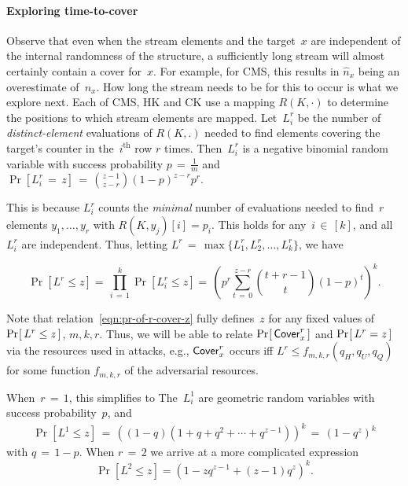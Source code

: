 \paragraph{Exploring time-to-cover}
Observe that even when the stream elements and the target~$x$ are independent of the internal randomness of the structure, a sufficiently long stream will almost certainly contain a cover for~$x$. For example, for CMS, this results in $\hat{n}_x$ being an overestimate of~$n_x$.  How long the stream needs to be for this to occur is what we explore next. 
Each of CMS, HK and CK use a mapping $R(K,\cdot)$ to determine the positions to which stream elements are mapped.
Let~$L^r_i$ be the number of \textit{distinct-element} evaluations of $R(K,.)$  
needed to find elements covering the target's counter in the~$i^{\mathrm{th}}$ row $r$ times. 
Then~$L^r_i$ is a negative binomial random variable with success probability $p\,{=}\, \frac{1}{m}$ and $\Pr[L^r_i \,{=}\,  z]\,{=}\,\binom{z-1}{z-r}(1-p)^{z-r}p^{r}$. 
This is because $L^r_i$ counts the \textit{minimal} number of evaluations needed to find~$r$ elements $y_1, {\dots}, y_r$ with $R(K,y_j)[i]=p_i$.
This holds for any~$i \,{\in}\,  [k]$, and all~$L^r_i$ are independent.
%
Thus, letting $L^r\,{=}\, \max\{L^r_1,L^r_2,{\dots},L^r_k\}$, we have 

\begin{equation}	
\Pr[ L^r \leq z ]{=}\, \prod_{i\,{=}\, 1}^{k} \Pr[L^r_i \leq z]{=}\, \left(p^{r} \sum_{t\,{=}\, 0}^{z-r}\binom{t+r-1}{t}(1-p)^t\right)^k{.}
\label{eqn:pr-of-r-cover-z}
\end{equation}
%

Note that relation~\eqref{eqn:pr-of-r-cover-z} fully defines~$z$ for any fixed values of $\Pr\hspace{-1pt}\left[\,L^r \leq z\,\right]$, $m, k, r$.  
Thus, we will be able to relate $\Pr\hspace{-1pt}\left[\,\mathsf{Cover}^{r}_{x}\,\right]$ and $\Pr\hspace{-1pt}\left[\,L^r=z\,\right]$ via the resources used in attacks, e.g., $\mathsf{Cover}^{r}_{x}$ occurs iff $L^r \leq f_{m,k,r}(q_H,q_U,q_Q)$ for some function $f_{m,k,r}$ of the adversarial resources. 

When~$r\,{=}\, 1$, this simplifies to
The~$L^1_i$ are geometric random variables with success probability~$p$, and 
\begin{eqnarray}
\Pr[ L^1 \leq z ] \,{=}\,  \left((1-q)(1+q+q^2+\cdots + q^{z-1})\right)^k \,{=}\,(1-q^z)^k
\label{eqn:pr-of-1-cover-z}
\end{eqnarray}
with $q\,{=}\, 1-p$.
When $r\,{=}\,2$ we arrive at a more complicated expression 
\begin{equation}
\Pr[L^2 \leq z] = (1- zq^{z-1} +(z-1)q^z  )^k.
\label{eqn:pr-of-2-cover-z}
\end{equation}

